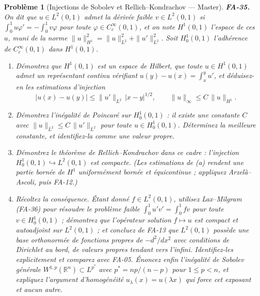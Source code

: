 \documentclass[11pt]{article}
\newtheorem{problem}{Problème}
\begin{document}
\begin{problem}[{Injections de Sobolev et Rellich--Kondrachov --- Master}]
\textbf{FA-35.} On dit que $ u \in L^2(0,1) $ admet la \textit{dérivée faible}
$ v \in L^2(0,1) $ si $ \int_0^1 u\varphi' = -\int_0^1 v\varphi $ pour toute
$ \varphi \in C_c^{\infty}(0,1) $, et on note $ H^1(0,1) $ l'espace de ces $ u $, muni de la
norme $ \|u\|_{H^1}^2 = \|u\|_{L^2}^2 + \|u'\|_{L^2}^2 $. Soit $ H_0^1(0,1) $ l'adhérence de
$ C_c^{\infty}(0,1) $ dans $ H^1(0,1) $.
\begin{enumerate}
\item[(a)] Démontrez que $ H^1(0,1) $ est un espace de Hilbert, que toute $ u \in H^1(0,1) $ admet un
représentant continu vérifiant $ u(y) - u(x) = \int_x^y u' $, et déduisez-en les estimations
d'injection
\[ |u(x) - u(y)| \le \|u'\|_{L^2}\,|x-y|^{1/2}, \qquad \|u\|_{\infty} \le C\,\|u\|_{H^1} . \]
\item[(b)] Démontrez l'inégalité de Poincaré sur $ H_0^1(0,1) $ : il existe une constante $ C $ avec
$ \|u\|_{L^2} \le C\,\|u'\|_{L^2} $ pour toute $ u \in H_0^1(0,1) $. Déterminez la meilleure
constante, et identifiez-la comme une valeur propre.
\item[(c)] Démontrez le théorème de Rellich--Kondrachov dans ce cadre : l'injection
$ H_0^1(0,1) \hookrightarrow L^2(0,1) $ est compacte. (Les estimations de (a) rendent une partie
bornée de $ H^1 $ uniformément bornée et équicontinue ; appliquez Arzelà--Ascoli, puis FA-12.)
\item[(d)] Récoltez la conséquence. Étant donné $ f \in L^2(0,1) $, utilisez Lax--Milgram (FA-36) pour
résoudre le problème faible $ \int_0^1 u'v' = \int_0^1 fv $ pour toute $ v \in H_0^1(0,1) $ ;
démontrez que l'opérateur solution $ f \mapsto u $ est compact et autoadjoint sur $ L^2(0,1) $ ; et
concluez de FA-13 que $ L^2(0,1) $ possède une base orthonormée de fonctions propres de
$ -d^2/dx^2 $ avec conditions de Dirichlet au bord, de valeurs propres tendant vers l'infini.
Identifiez-les explicitement et comparez avec FA-05. Énoncez enfin l'inégalité de Sobolev générale
$ W^{1,p}(\mathbb{R}^n) \subset L^{p^*} $ avec $ p^{*} = np/(n-p) $ pour $ 1 \le p < n $, et
expliquez l'argument d'homogénéité $ u_\lambda(x) = u(\lambda x) $ qui force cet exposant et aucun
autre.
\end{enumerate}

\end{problem}
\end{document}
